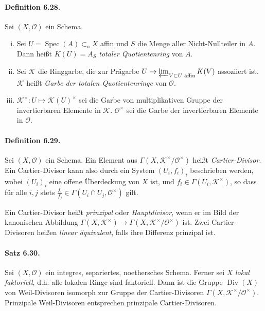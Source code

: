 \documentclass[11pt,b5paper,openany]{memoir}
\begin{document}
\paragraph{Definition 6.28.}\label{6.28} Sei $(X,\mathcal{O})$ ein Schema.
\begin{enumerate}[(i)]
\item Sei $U=\operatorname{Spec}(A)\subset_\text{o}X$ affin und $S$ die Menge aller Nicht-Nullteiler in $A$. Dann heißt $K(U)=A_S$ \textit{totaler Quotientenring} von $A$.
\item Sei $\mathcal{K}$ die Ringgarbe, die zur Prägarbe $U\mapsto\varprojlim_{V\subset U\text{ affin}} K(V)$ assoziiert ist. $\mathcal{K}$ heißt \textit{Garbe der totalen Quotientenringe} von $\mathcal{O}$.
\item $\mathcal{K}^\times:U\mapsto \mathcal{K}(U)^\times$ sei die Garbe von multiplikativen Gruppe der invertierbaren Elemente in $\mathcal{K}$. $\mathcal{O}^\times$ sei die Garbe der invertierbaren Elemente in $\mathcal{O}$.
\end{enumerate}

\paragraph{Definition 6.29.}\label{6.29} Sei $(X,\mathcal{O})$ ein Schema. Ein Element aus $\Gamma(X,\mathcal{K}^\times/\mathcal{O}^\times)$ heißt \textit{Cartier-Divisor}. Ein Cartier-Divisor kann also durch ein System $(U_i,f_i)_i$ beschrieben werden, wobei $(U_i)_i$ eine offene Überdeckung von $X$ ist, und $f_i\in\Gamma(U_i,\mathcal{K}^\times)$, so dass für alle $i,j$ stets $\frac{f_i}{f_j}\in\Gamma(U_i\cap U_j,\mathcal{O}^\times)$ gilt.

Ein Cartier-Divisor heißt \textit{prinzipal} oder \textit{Hauptdivisor}, wenn er im Bild der kanonischen Abbildung $\Gamma(X,\mathcal{K}^\times)\to\Gamma(X,\mathcal{K}^\times/\mathcal{O}^\times)$ ist. Zwei Cartier-Divisoren heißen \textit{linear äquivalent}, falls ihre Differenz prinzipal ist.

\paragraph{Satz 6.30.}\label{6.30} Sei $(X,\mathcal{O})$ ein integres, separiertes, noethersches Schema. Ferner sei $X$ \textit{lokal faktoriell}, d.h. alle lokalen Ringe sind faktoriell. Dann ist die Gruppe $\operatorname{Div}(X)$ von Weil-Divisoren isomorph zur Gruppe der Cartier-Divisoren $\Gamma(X,\mathcal{K}^\times/\mathcal{O}^\times)$. Prinzipale Weil-Divisoren entsprechen prinzipale Cartier-Divisoren.
\end{document}
